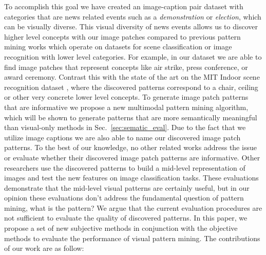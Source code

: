 \documentclass[10pt,twocolumn,letterpaper]{article}
\begin{document}
To accomplish this goal we have created an image-caption pair dataset with categories that are news related events such as a {\it demonstration} or {\it election}, which can be visually diverse.
This visual diversity of news events allows us to discover higher level concepts with our image patches compared to previous pattern mining works which operate on datasets for scene classification or image recognition with lower level categories.
For example, in our dataset we are able to find image patches that represent concepts like air strike, press conference, or award ceremony.
Contrast this with the state of the art on the MIT Indoor scene recognition dataset \cite{LiLSH15CVPR}, where the discovered patterns correspond to a chair, ceiling or other very concrete lower level concepts.
To generate image patch patterns that are informative we propose a new multimodal pattern mining algorithm, which will be shown to generate patterns that are more semantically meaningful than visual-only methods in Sec.~\ref{sec:sematic_eval}.
Due to the fact that we utilize image captions we are also able to name our discovered image patch patterns.
To the best of our knowledge, no other related works address the issue or evaluate whether their discovered image patch patterns are informative.
Other researchers use the discovered patterns to build a mid-level representation of images and test the new features on image classification tasks.
These evaluations demonstrate that the mid-level visual patterns are certainly useful, but in our opinion these evaluations don't address the fundamental question of pattern mining, what is the pattern?
We argue that the current evaluation procedures are not sufficient to evaluate the quality of discovered patterns.
In this paper, we propose a set of new subjective methods in conjunction with the objective methods to evaluate the performance of visual pattern mining.
The contributions of our work are as follow:
\end{document}
